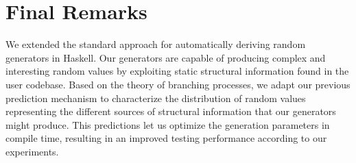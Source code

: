 \section{Final Remarks}

We extended the standard approach for automatically deriving random generators
in Haskell.
%
Our generators are capable of producing complex and interesting random values by
exploiting static structural information found in the user codebase.
%
Based on the theory of branching processes, we adapt our previous prediction
mechanism to characterize the distribution of random values representing the
different sources of structural information that our generators might produce.
%
This predictions let us optimize the generation parameters in compile time,
resulting in an improved testing performance according to our experiments.

